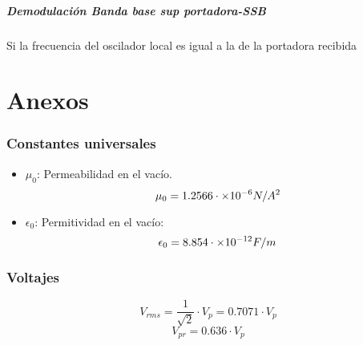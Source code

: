 \documentclass[
	12pt, %
	fleqn, %
	a4paper, %
	oneside, %
]{LegrandOrangeBook}
\begin{document}
\subsubsection*{Demodulación Banda base sup portadora-SSB}
Si la frecuencia del oscilador local es igual a la de la portadora recibida

\part{Anexos}
\section{Constantes universales}
\begin{itemize}
\item $\mu_0$: Permeabilidad en el vacío.
\begin{displaymath}
\mu_0=1.2566\cdot\times 10^{-6} N/A^2
\end{displaymath}
\item $\epsilon_0$: Permitividad en el vacío:
\begin{displaymath}
\epsilon_0=8.854\cdot\times 10^{-12} F/m
\end{displaymath}
\end{itemize}
\section{Voltajes}
\begin{center}
\end{center}
\begin{equation}
V_{rms}=\frac{1}{\sqrt{2}}\cdot V_p=0.7071\cdot V_p
\label{eq:vrms}
\end{equation}
\begin{equation}
V_{pr}=0.636\cdot V_p
\label{eq:vprom}
\end{equation}
\stopcontents[part] %

\end{document}
